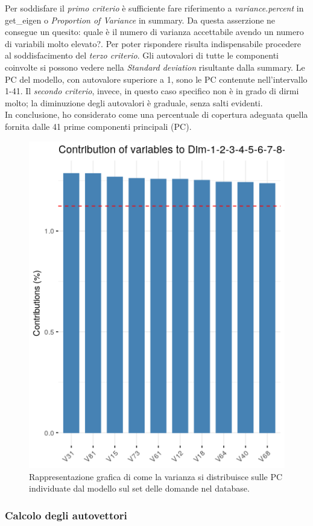 \noindent
Per soddisfare il \textit{primo criterio} \`e sufficiente fare riferimento a \textit{variance.percent} in get\_eigen o \textit{Proportion of Variance} in summary. Da questa asserzione ne consegue un quesito: quale \`e il numero di varianza accettabile avendo un numero di variabili molto elevato?.
Per poter rispondere risulta indispensabile procedere al soddisfacimento del \textit{terzo criterio}. Gli autovalori di tutte le componenti coinvolte si possono vedere nella \textit{Standard deviation} risultante dalla summary. Le PC del modello, con autovalore superiore a 1, sono le PC contenute nell'intervallo 1-41.
Il \textit{secondo criterio}, invece, in questo caso specifico non \`e in grado di dirmi molto; la diminuzione degli autovalori \`e graduale, senza salti evidenti.\\
In conclusione, ho considerato come una percentuale di copertura adeguata quella fornita dalle 41 prime componenti principali (PC).
\begin{figure}[H]
\centering
	\includegraphics[width=0.60\linewidth]{../../PCA/plot/varianza-complessiva_rete-db.png}
	\caption{Rappresentazione grafica di come la varianza si distribuisce sulle PC individuate dal modello sul set delle domande nel database.}
	\label{Rappresentazione grafica di come la varianza si distribuisce sulle PC individuate dal modello sul set delle domande nel database.}
\end{figure}

\subsubsection{Calcolo degli autovettori}
\label{Calcolo degli autovettori}

